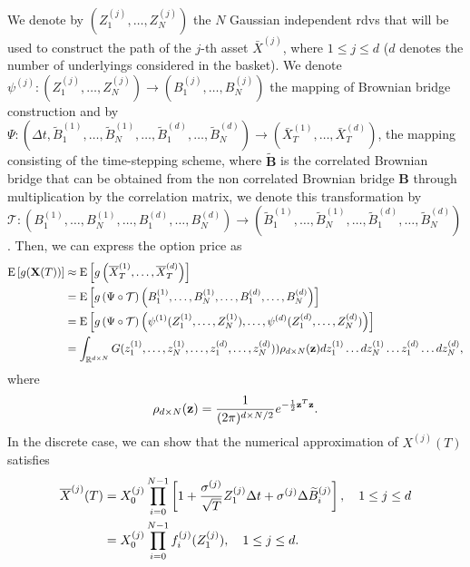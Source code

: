 We denote by $(Z_1^{(j)},\dots,Z_N^{(j)})$ the $N$ Gaussian independent rdvs that will be used to construct the path of the $j$-th asset $\bar{X}^{(j)}$, where $1 \le j \le d$ ($d$ denotes the number of underlyings considered in the basket). We denote  $\psi^{(j)}: (Z_1^{(j)},\dots,Z_N^{(j)}) \rightarrow (B_1^{(j)},\dots,B_N^{(j)})$ the mapping of Brownian bridge construction and by $\Psi: (\Delta t, \widetilde{B}^{(1)}_1,\dots,\widetilde{B}^{(1)}_N,\dots, \widetilde{B}^{(d)}_1,\dots,\widetilde{B}^{(d)}_N) \rightarrow \left(\bar{X}^{(1)}_T,\dots,\bar{X}^{(d)}_T \right)$, the mapping consisting of the time-stepping scheme, where $\widetilde{\mathbf{B}}$ is the correlated Brownian bridge that can be obtained from the non correlated Brownian bridge $\mathbf{B}$ through multiplication by the correlation matrix, we denote this transformation by $\mathcal{T}: \left(B^{(1)}_1,\dots,B^{(1)}_N,\dots, B^{(d)}_1,\dots,B^{(d)}_N \right) \rightarrow \left(\widetilde{B}^{(1)}_1,\dots,\widetilde{B}^{(1)}_N,\dots, \widetilde{B}^{(d)}_1,\dots,\widetilde{B}^{(d)}_N\right)$. Then, we can express the option price as
\begin{align}\label{eq: option price as integral_basket}
	\mathrm{E}\left[g(\mathbf{X}(T))\right]&\approx	\mathrm{E}\left[g\left(\overline{X}_T^{(1)}, \dots,\overline{X}_T^{(d)} \right)\right] \nonumber\\
	&=\mathrm{E}\left[g\left(\Psi\circ \mathcal{T} \right) \left(B^{(1)}_1,\dots,B^{(1)}_N,\dots, B^{(d)}_1,\dots,B^{(d)}_N \right)\right] \nonumber\\
		&=\mathrm{E}\left[g\left(\Psi \circ \mathcal{T} \right) \left(\psi^{(1)}(Z_1^{(1)}, \dots, Z_N^{(1)}), \dots, \psi^{(d)}(Z_1^{(d)},\dots,Z^{(d)}_N)\right)\right] \nonumber\\
	&=\int_{\mathbb{R}^{d \times N}} G(z_1^{(1)}, \dots, z_N^{(1)}, \dots, z_1^{(d)},\dots,z^{(d)}_N)) \rho_{d \times N}(\mathbf{z}) dz_1^{(1)} \dots dz_N^{(1)} \dots z_1^{(d)} \dots dz^{(d)}_N ,
\end{align}
where 
\begin{equation*}
\rho_{d \times N}(\mathbf{z})=\frac{1}{(2 \pi)^{{d \times N}/2}} e^{-\frac{1}{2} \mathbf{z}^T \mathbf{z}} .
\end{equation*}
In the discrete case, we can show that the numerical approximation of $X^{(j)}(T)$ satisfies
\begin{align}\label{eq:discrete_rep}
	\overline{X}^{(j)}(T)&=X_0^{(j)} \prod_{i=0}^{N-1} \left[ 1+\frac{\sigma^{(j)}}{\sqrt{T}} Z^{(j)}_1 \Delta t+ \sigma^{(j)} \Delta \widetilde{B}^{(j)}_{i}\right], \quad 1 \le j \le d \nonumber\\
	&= X_0^{(j)} \prod_{i=0}^{N-1} f_i^{(j)}(Z^{(j)}_1) , \quad 1 \le j \le d .
\end{align}

